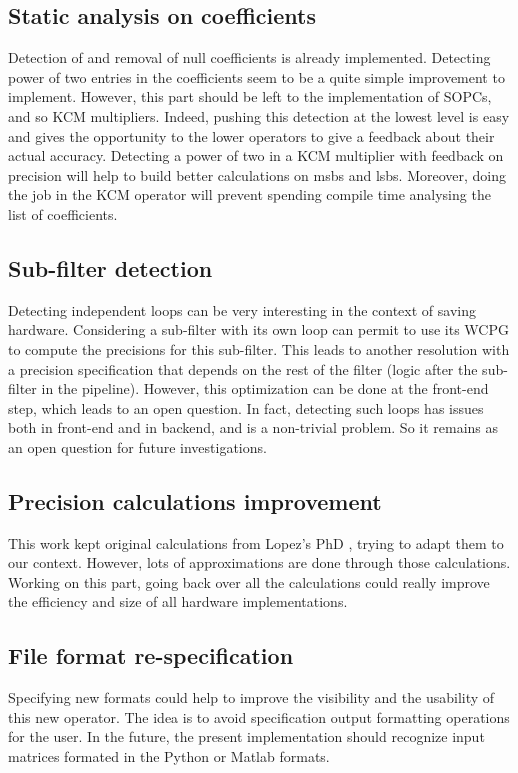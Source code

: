\subsection{Static analysis on coefficients}
	Detection of and removal of null coefficients is already implemented.
	Detecting power of two entries in the coefficients seem to be a quite simple improvement to implement.
	However, this part should be left to the implementation of SOPCs, and so KCM multipliers.
	Indeed, pushing this detection at the lowest level is easy and gives the opportunity to the lower operators to give a feedback about their actual accuracy.
	Detecting a power of two in a KCM multiplier with feedback on precision will help to build better calculations on msbs and lsbs.
	Moreover, doing the job in the KCM operator will prevent spending compile time analysing the list of coefficients.



\subsection{Sub-filter detection}
	Detecting independent loops can be very interesting in the context of saving hardware.
	Considering a sub-filter with its own loop can permit to use its WCPG to compute the precisions for this sub-filter.
	This leads to another resolution with a precision specification that depends on the rest of the filter (logic after the sub-filter in the pipeline).
	However, this optimization can be done at the front-end step, which leads to an open question.
	In fact, detecting such loops has issues both in front-end and in backend, and is a non-trivial problem.
	So it remains as an open question for future investigations.

\subsection{Precision calculations improvement}
	This work kept original calculations from Lopez's PhD \cite{lopez}, trying to adapt them to our context.
	However, lots of approximations are done through those calculations.
	Working on this part, going back over all the calculations could really improve the efficiency and size of all hardware implementations.


\subsection{File format re-specification}
	Specifying new formats could help to improve the visibility and the usability of this new operator.
	The idea is to avoid specification output formatting operations for the user.
	In the future, the present implementation should recognize input matrices formated in the Python or Matlab formats.
